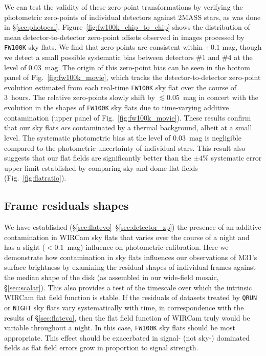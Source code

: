 \documentclass[iop,tighten]{emulateapj}
\newcommand{\Fig}[1]{Fig.~\ref{fig:#1}}  %
\newcommand{\Sec}[1]{\S\ref{sec:#1}}  %
\begin{document}
We can test the validity of these zero-point transformations by verifying the photometric zero-points of individual detectors against 2MASS stars, as was done in \Sec{photocal}.
Figure~\ref{fig:fw100k_chip_to_chip} shows the distribution of mean detector-to-detector zero-point offsets observed in images processed by \texttt{FW100K} sky flats.
We find that zero-points are consistent within $\pm 0.1$ mag, though we detect a small possible systematic bias between detectors \#1 and \#4 at the level of $0.03$~mag.
The origin of this zero-point bias can be seen in the bottom panel of \Fig{fw100k_movie}, which tracks the detector-to-detector zero-point evolution estimated from each real-time \texttt{FW100K} sky flat over the course of 3~hours.
The relative zero-points slowly shift by $\lesssim 0.05$~mag in concert with the evolution in the shapes of \texttt{FW100K} sky flats due to time-varying additive contamination (upper panel of \Fig{fw100k_movie}).
These results confirm that our sky flats \emph{are} contaminated by a thermal background, albeit at a small level.
The systematic photometric bias at the level of $0.03$~mag is negligible compared to the photometric uncertainty of individual stars.
This result also suggests that our flat fields are significantly better than the $\pm 4$\% systematic error upper limit established by comparing sky and dome flat fields (\Fig{flatratio}).

\subsection{Frame residuals shapes}
\label{sec:frameblockresiduals}

We have established (\Sec{flatevo}--\Sec{detector_zp}) the presence of an additive contamination in WIRCam sky flats that varies over the course of a night and has a slight ($<0.1$~mag) influence on photometric calibration.
Here we demonstrate how contamination in sky flats influences our observations of M31's surface brightness by examining the residual shapes of individual frames against the median shape of the disk (as assembled in our wide-field mosaic, \Sec{scalar}).
This also provides a test of the timescale over which the intrinsic WIRCam flat field function is stable.
If the residuals of datasets treated by \texttt{QRUN} or \texttt{NIGHT} sky flats vary systematically with time, in correspondence with the results of \Sec{flatevo}, then the flat field function of WIRCam truly would be variable throughout a night.
In this case, \texttt{FW100K} sky flats should be most appropriate.
This effect should be exacerbated in signal- (not sky-) dominated fields as flat field errors grow in proportion to signal strength.
\end{document}
